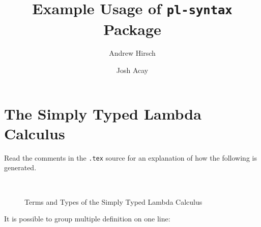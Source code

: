 \documentclass{article}
\title{Example Usage of \texttt{pl-syntax} Package}
\author{Andrew Hirsch \and Josh Acay}
\begin{document}
\maketitle

\section{The Simply Typed Lambda Calculus}

Read the comments in the \texttt{.tex} source for an explanation of how
the following is generated.

\begin{figure}[h]
  \begin{syntax}




    \separate

    \category[Types]{\tau}
    \\

    \category[Contexts]{\Gamma}


  \end{syntax}

  \caption{Terms and Types of the Simply Typed Lambda Calculus}
  \label{fig:abstract-syntax}
\end{figure}

It is possible to group multiple definition on one line:
\begin{syntax}

\end{syntax}
\end{document}
